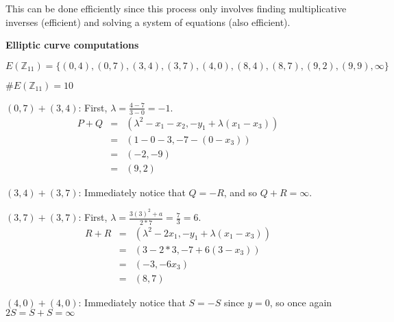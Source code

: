 \documentclass[12pt]{article}
\begin{document}
\begin{list}{.}{}
This can be done efficiently since this process only involves finding
multiplicative inverses (efficient) and solving a system of equations (also
efficient).

\item \textbf{Elliptic curve computations}
\begin{list}{)}{}
\item $E(\mathbb{Z}_{11}) = \{(0,4), (0,7), (3,4), (3,7), (4,0), (8,4), (8,7),
(9,2), (9,9), \infty\}$
\item $\#E(\mathbb{Z}_{11}) = 10$
\begin{list}{)}{}
\item $(0,7) + (3,4)$: First, $\lambda = \frac{4-7}{3-0} = -1$.
\begin{eqnarray*}
P + Q &=& (\lambda^2 - x_1 - x_2, -y_1 + \lambda(x_1-x_3))\\
&=& (1 - 0 - 3, -7 -(0 - x_3))\\
&=& (-2, -9)\\
&=& (9,2)
\end{eqnarray*}
\item $(3,4) + (3,7)$: Immediately notice that $Q = -R$, and so $Q+R=\infty$.
\item $(3,7) + (3,7)$: First, $\lambda = \frac{3(3)^2 + a}{2*7} = \frac{7}{3} =
6$.
\begin{eqnarray*}
R + R &=& (\lambda^2 - 2x_1, -y_1 + \lambda(x_1-x_3))\\
&=& (3 - 2*3, -7 +6(3 - x_3))\\
&=& (-3, -6x_3)\\
&=& (8, 7)
\end{eqnarray*}
\item $(4,0) + (4,0)$: Immediately notice that $S = -S$ since $y = 0$, so once
again $2S = S + S = \infty$
\end{list}

\end{list}

\end{list}
\end{document}
